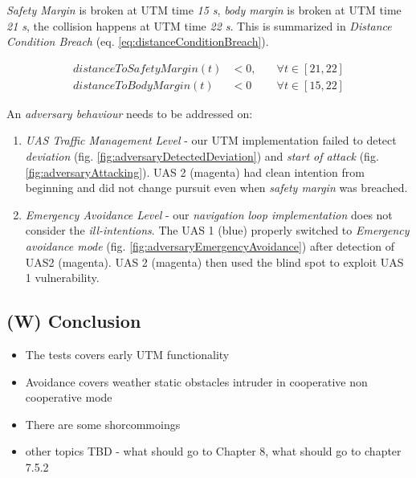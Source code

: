 \emph{Safety Margin} is broken at UTM time \emph{15 s}, \emph{body margin} is broken at UTM time \emph{21 s}, the collision happens at  UTM time \emph{22 s}. This is summarized in \emph{Distance Condition Breach} (eq. \ref{eq:distanceConditionBreach}).

\begin{equation}\label{eq:distanceConditionBreach}
    \begin{aligned}
    distanceToSafetyMargin(t) &< 0,\quad &\forall t \in [21,22]\\
    distanceToBodyMargin(t)  &< 0 \quad &\forall t \in [15,22]
    \end{aligned}
\end{equation}

\begin{note}
    An \emph{adversary behaviour} needs to be addressed on:
    \begin{enumerate}
        \item  \emph{UAS Traffic Management Level} -  our UTM implementation failed to detect \emph{deviation} (fig. \ref{fig:adversaryDetectedDeviation}) and \emph{start of attack} (fig. \ref{fig:adversaryAttacking}). UAS 2 (magenta) had clean intention from beginning and did not change pursuit even when \emph{safety margin} was breached. 
        
        \item  \emph{Emergency Avoidance Level} - our \emph{navigation loop implementation} does not consider the \emph{ill-intentions}. The UAS 1 (blue) properly switched to \emph{Emergency avoidance mode} (fig. \ref{fig:adversaryEmergencyAvoidance}) after detection of UAS2 (magenta). UAS 2 (magenta) then used the blind spot to exploit UAS 1 vulnerability.   
    \end{enumerate}
\end{note}

\subsection{(W) Conclusion}\label{s:TestingConclusion}

\begin{itemize}
    \item The tests covers early UTM functionality
    \item Avoidance covers weather static obstacles intruder in cooperative non cooperative mode
    \item There are some shorcommoings
    \item other topics TBD - what should go to Chapter 8, what should go to chapter 7.5.2
\end{itemize}